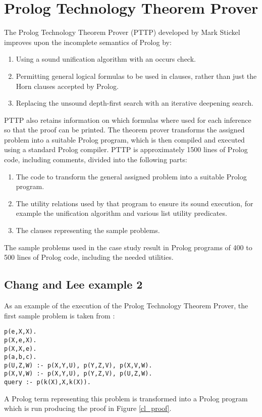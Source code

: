 \section{Prolog Technology Theorem Prover} %
\label{case_pttp}

The Prolog Technology Theorem Prover (PTTP) developed by Mark Stickel \cite{Sti88}
improves upon the incomplete semantics of Prolog by:
\begin{enumerate}
\item{Using a sound unification algorithm with an occurs check.}
\item{Permitting general logical formulas to be used in clauses, rather than just the
Horn clauses accepted by Prolog.}
\item{Replacing the unsound depth-first search with an iterative deepening search.}
\end{enumerate}
PTTP also retains information on which formulas where used for each inference so that
the proof can be printed.  The theorem prover transforms the assigned problem into a
suitable Prolog program, which is then compiled and executed using a standard Prolog
compiler.  PTTP is approximately 1500 lines of Prolog code, including comments,
divided into the following parts:
\begin{enumerate}
\item{The code to transform the general assigned problem into a suitable Prolog
program.}
\item{The utility relations used by that program to ensure its sound execution, for
  example the unification algorithm and various list utility predicates.}
\item{The clauses representing the sample problems.}
\end{enumerate}
The sample problems used in the case study result in Prolog programs of 400 to 500
lines of Prolog code, including the needed utilities.

\subsection{Chang and Lee example 2}

As an example of the execution of the Prolog Technology Theorem Prover, 
the first sample problem is taken from \cite{CL73}:
\begin{verbatim}
p(e,X,X).
p(X,e,X).
p(X,X,e).
p(a,b,c).
p(U,Z,W) :- p(X,Y,U), p(Y,Z,V), p(X,V,W).
p(X,V,W) :- p(X,Y,U), p(Y,Z,V), p(U,Z,W).
query :- p(k(X),X,k(X)).
\end{verbatim}
A Prolog term representing this problem is transformed into a Prolog program which
is run producing the proof in Figure \ref{cl_proof}.

